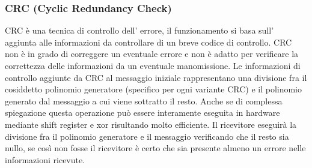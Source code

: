 \begin{itemize}
 \subsubsection{CRC (Cyclic Redundancy Check)}
 CRC è una tecnica di controllo dell' errore, il funzionamento si basa sull' aggiunta alle informazioni da controllare di un breve codice di controllo. CRC non è in grado di correggere un eventuale errore e non è adatto per verificare la correttezza delle informazioni da un eventuale manomissione. Le informazioni di controllo aggiunte da CRC al messaggio iniziale rappresentano una divisione fra il cosiddetto polinomio generatore (specifico per ogni variante CRC) e il polinomio generato dal messaggio a cui viene sottratto il resto. Anche se di complessa spiegazione questa operazione può essere interamente eseguita in hardware mediante shift register e xor  risultando molto efficiente. Il ricevitore eseguirà la divisione fra il polinomio generatore e il messaggio verificando che il resto sia nullo, se così non fosse il ricevitore è certo che sia presente almeno un errore nelle informazioni ricevute. \cite{crc}
 

\end{itemize}
